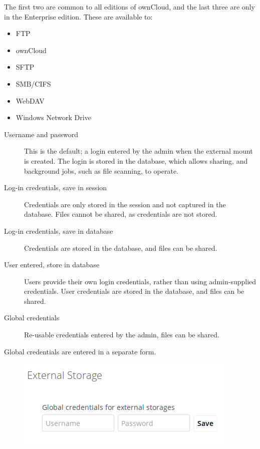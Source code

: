 \documentclass[letterpaper,10pt,english]{sphinxmanual}
\begin{document}
The first two are common to all editions of ownCloud, and the last three are
only in the Enterprise edition. These are available to:
\begin{itemize}
\item {} 
FTP

\item {} 
ownCloud

\item {} 
SFTP

\item {} 
SMB/CIFS

\item {} 
WebDAV

\item {} 
Windows Network Drive

\end{itemize}
\begin{description}
\item[{Username and password}] \leavevmode
This is the default; a login entered by the admin when the external mount is
created. The login is stored in the database, which allows sharing, and
background jobs, such as file scanning, to operate.

\item[{Log-in credentials, save in session}] \leavevmode
Credentials are only stored in the session and not captured in the database.
Files cannot be shared, as credentials are not stored.

\item[{Log-in credentials, save in database}] \leavevmode
Credentials are stored in the database, and files can be shared.

\item[{User entered, store in database}] \leavevmode
Users provide their own login credentials, rather than using admin-supplied
credentials. User credentials are stored in the  database, and files can be
shared.

\item[{Global credentials}] \leavevmode
Re-usable credentials entered by the admin, files can be shared.

\end{description}

Global credentials are entered in a separate form.
\begin{figure}[htbp]
\centering

\includegraphics{auth_backends-2.png}
\end{figure}
\end{document}
